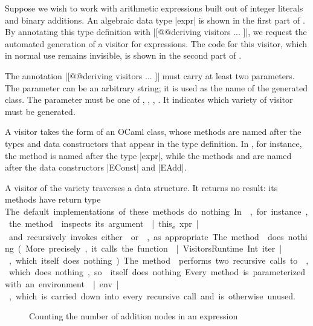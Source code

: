 \documentclass[onecolumn,11pt,nocopyrightspace]{sigplanconf}
\begin{document}
Suppose we wish to work with arithmetic expressions built out of integer
literals and binary additions. An algebraic data type \oc|expr| is shown in
the first part of . By annotating this type definition with
\oc|[@@deriving visitors { ... }]|, we request the automated generation of
a visitor for expressions. The code for this visitor, which in normal use
remains invisible, is shown in the second part of .

The annotation \oc|[@@deriving visitors { ... }]| must carry at least two
parameters. The parameter \name can be an arbitrary string; it is used as the
name of the generated class. The parameter \variety must be one of \iter,
\map, \itertwo, \maptwo. It indicates which variety of visitor must be
generated.

A visitor takes the form of an OCaml class, whose methods are named after the
types and data constructors that appear in the type definition. In
, for instance, the method  is named after
the type \oc|expr|, while the methods  and
 are named after the data constructors \oc|EConst| and
\oc|EAdd|.

A visitor of the \iter variety traverses a data structure. It returns no
result: its methods have return type \unit. The default implementations of
these methods do nothing. In , for instance, the method
 inspects its argument \oc|this_expr| and recursively
invokes either  or , as
appropriate. The method  does nothing. (More precisely,
it calls the function \oc|VisitorsRuntime.Int.iter|, which itself does
nothing.) The method  performs two recursive calls to
, which does nothing, so  itself does
nothing.

Every method is parameterized with an environment \oc|env|, which is carried
down into every recursive call and is otherwise unused.


\begin{figure}[t]
\begin{origenv}

\end{origenv}
\caption{Counting the number of addition nodes in an expression}
\label{fig:expr04}
\end{figure}
\end{document}

